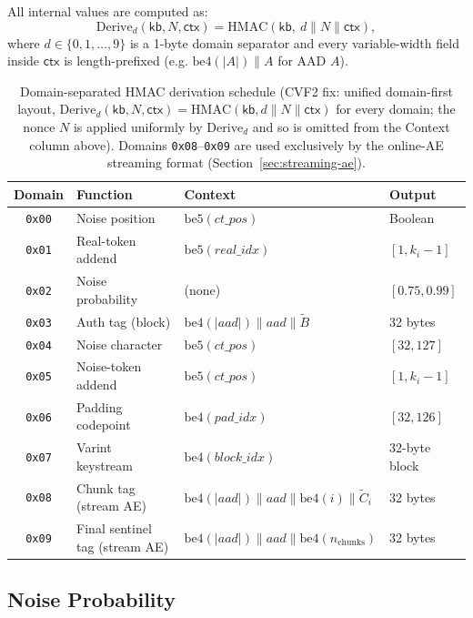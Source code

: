 \documentclass[11pt,a4paper]{article}
\begin{document}
All internal values are computed as:
\[
  \mathrm{Derive}_d(\mathsf{kb}, N, \mathsf{ctx}) = \mathrm{HMAC}(\mathsf{kb},\ d \| N \| \mathsf{ctx}),
\]
where $d \in \{0,1,\ldots,9\}$ is a 1-byte domain separator and every
variable-width field inside $\mathsf{ctx}$ is length-prefixed (e.g.
$\mathrm{be4}(|A|) \| A$ for AAD $A$).

\begin{table}[h]
\centering
\begin{tabular}{@{}clll@{}}
\toprule
Domain & Function & Context & Output \\
\midrule
\texttt{0x00} & Noise position & $\mathrm{be5}(ct\_pos)$ & Boolean \\
\texttt{0x01} & Real-token addend & $\mathrm{be5}(real\_idx)$ & $[1, k_i - 1]$ \\
\texttt{0x02} & Noise probability & (none) & $[0.75, 0.99]$ \\
\texttt{0x03} & Auth tag (block) & $\mathrm{be4}(\lvert aad \rvert) \| aad \| \widetilde{B}$ & 32 bytes \\
\texttt{0x04} & Noise character & $\mathrm{be5}(ct\_pos)$ & $[32, 127]$ \\
\texttt{0x05} & Noise-token addend & $\mathrm{be5}(ct\_pos)$ & $[1, k_i - 1]$ \\
\texttt{0x06} & Padding codepoint & $\mathrm{be4}(pad\_idx)$ & $[32, 126]$ \\
\texttt{0x07} & Varint keystream & $\mathrm{be4}(block\_idx)$ & 32-byte block \\
\texttt{0x08} & Chunk tag (stream AE) & $\mathrm{be4}(\lvert aad \rvert) \| aad \| \mathrm{be4}(i) \| \tilde{C}_i$ & 32 bytes \\
\texttt{0x09} & Final sentinel tag (stream AE) & $\mathrm{be4}(\lvert aad \rvert) \| aad \| \mathrm{be4}(n_{\mathrm{chunks}})$ & 32 bytes \\
\bottomrule
\end{tabular}
\caption{Domain-separated HMAC derivation schedule (CVF2 fix: unified domain-first layout, $\mathrm{Derive}_d(\mathsf{kb},N,\mathsf{ctx}) = \mathrm{HMAC}(\mathsf{kb}, d\|N\|\mathsf{ctx})$ for every domain; the nonce $N$ is applied uniformly by $\mathrm{Derive}_d$ and so is omitted from the Context column above). Domains \texttt{0x08}--\texttt{0x09} are used exclusively by the online-AE streaming format (Section~\ref{sec:streaming-ae}).}
\label{tab:domains}
\end{table}

\subsection{Noise Probability}
\end{document}
